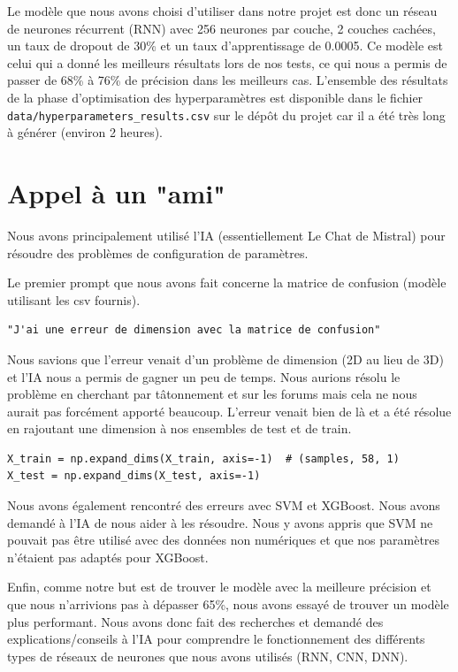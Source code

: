 \documentclass{article}
\begin{document}
Le modèle que nous avons choisi d'utiliser dans notre projet est donc un réseau de neurones récurrent (RNN) avec 256 neurones par couche, 2 couches cachées, un taux de dropout de 30\% et un taux d'apprentissage de 0.0005. Ce modèle est celui qui a donné les meilleurs résultats lors de nos tests, ce qui nous a permis de passer de 68\% à 76\% de précision dans les meilleurs cas. L'ensemble des résultats de la phase d'optimisation des hyperparamètres est disponible dans le fichier \texttt{data/hyperparameters\_results.csv} sur le dépôt du projet car il a été très long à générer (environ 2 heures).

\section{Appel à un "ami"}

Nous avons principalement utilisé l'IA (essentiellement Le Chat de Mistral) pour résoudre des problèmes de configuration de paramètres.

Le premier prompt que nous avons fait concerne la matrice de confusion (modèle utilisant les csv fournis).

\begin{verbatim}
"J'ai une erreur de dimension avec la matrice de confusion"
\end{verbatim}

Nous savions que l'erreur venait d'un problème de dimension (2D au lieu de 3D) et l'IA nous a permis de gagner un peu de temps. Nous aurions résolu le problème en cherchant par tâtonnement et sur les forums mais cela ne nous aurait pas forcément apporté beaucoup. L'erreur venait bien de là et a été résolue en rajoutant une dimension à nos ensembles de test et de train.

\begin{verbatim}
X_train = np.expand_dims(X_train, axis=-1)  # (samples, 58, 1)
X_test = np.expand_dims(X_test, axis=-1)
\end{verbatim}

Nous avons également rencontré des erreurs avec SVM et XGBoost. Nous avons demandé à l'IA de nous aider à les résoudre. Nous y avons appris que SVM ne pouvait pas être utilisé avec des données non numériques et que nos paramètres n'étaient pas adaptés pour XGBoost.

Enfin, comme notre but est de trouver le modèle avec la meilleure précision et que nous n'arrivions pas à dépasser 65\%, nous avons essayé de trouver un modèle plus performant. Nous avons donc fait des recherches et demandé des explications/conseils à l'IA pour comprendre le fonctionnement des différents types de réseaux de neurones que nous avons utilisés (RNN, CNN, DNN).
\end{document}
